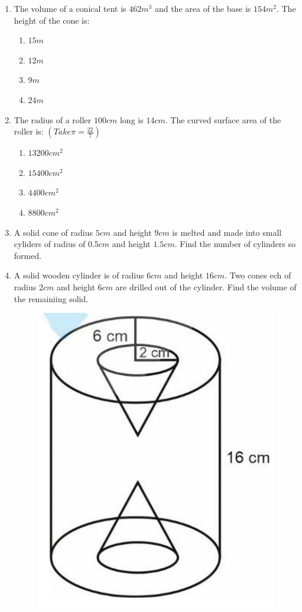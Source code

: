  \begin{enumerate}
	 \item The volume of a conical tent is $462 m^{3}$ and the area of the base is $154 m^{2}$. The height of the cone is:
		 \begin{enumerate}
			 \item $15 m$
			 \item $12 m$
			 \item $9 m$
			 \item $24 m$
		 \end{enumerate}
	 \item The radius of a roller $100 cm$ long is $14 cm$. The curved surface area of the roller is: $(Take \pi = \frac{22}{7})$
		 \begin{enumerate}
			 \item $13200 cm^{2}$
			 \item $15400 cm^{2}$
			 \item $4400 cm^{2}$
			 \item $8800 cm^{2}$
		 \end{enumerate}
	 \item A solid cone of radius $5 cm$ and height $9 cm$ is melted and made into small cyliders of radius of $0.5 cm$ and height $1.5 cm$. Find the number of cylinders so formed.
	 \item A solid wooden cylinder is of radius $6 cm$ and height $16 cm$. Two cones ech of radius $2 cm$ and height $6 cm$ are drilled out of the cylinder. Find the volume of the remainiing solid.\\
		 \begin{figure}[h]
			 \centering
			 \includegraphics[width=\columnwidth]{figs/img1.jpg}
			 \caption{}
			 \label{Figure}
		 \end{figure}
 \end{enumerate}
